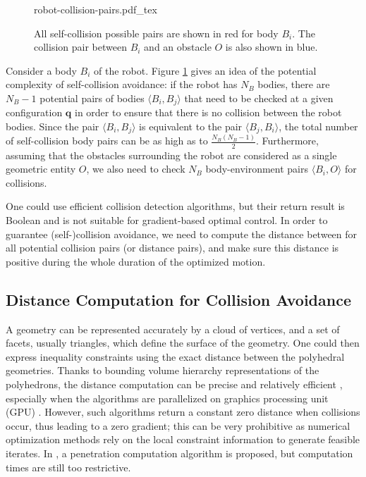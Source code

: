 \begin{figure}
  \centering
      {\def\svgwidth{0.59\linewidth}
        
                   {robot-collision-pairs.pdf_tex}
      }
      \caption{All self-collision possible pairs are shown in red for
        body $B_i$. The collision pair between $B_i$ and an obstacle
        $O$ is also shown in blue.}
      \label{fig:chap3-robot-collision-pairs}
\end{figure}

Consider a body $B_i$ of the robot. Figure
\ref{fig:chap3-robot-collision-pairs} gives an idea of the potential
complexity of self-collision avoidance: if the robot has $N_B$ bodies,
there are $N_B-1$ potential pairs of bodies $\langle B_i,B_j\rangle$
that need to be checked at a given configuration $\mathbf{q}$ in order
to ensure that there is no collision between the robot bodies. Since
the pair $\langle B_i,B_j\rangle$ is equivalent to the pair $\langle
B_j,B_i\rangle$, the total number of self-collision body pairs can be
as high as to $\frac{N_B(N_B-1)}{2}$. Furthermore, assuming that the
obstacles surrounding the robot are considered as a single geometric
entity $O$, we also need to check $N_B$ body-environment pairs
$\langle B_i,O\rangle$ for collisions.

One could use efficient collision detection algorithms, but their
return result is Boolean and is not suitable for gradient-based
optimal control. In order to guarantee (self-)collision avoidance, we
need to compute the distance between for all potential collision pairs
(or distance pairs), and make sure this distance is positive during
the whole duration of the optimized motion.

\subsection{Distance Computation for Collision Avoidance}

A geometry can be represented accurately by a cloud of vertices, and a
set of facets, usually triangles, which define the surface of the
geometry. One could then express inequality constraints using the
exact distance between the polyhedral geometries. Thanks to bounding
volume hierarchy representations of the polyhedrons, the distance
computation can be precise and relatively efficient \cite{Larsen2000},
especially when the algorithms are parallelized on graphics processing
unit (GPU) \cite{lauterbach2010gproximity}. However, such algorithms
return a constant zero distance when collisions occur, thus leading to
a zero gradient; this can be very prohibitive as numerical
optimization methods rely on the local constraint information to
generate feasible iterates. In \cite{Kim2002}, a penetration
computation algorithm is proposed, but computation times are still too
restrictive. 

